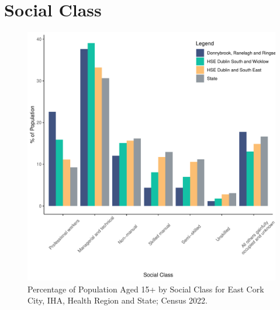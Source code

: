 \documentclass{article}
\begin{document}
\section{Social Class}\label{sect:SC}
\begin{figure}[H]
	\centering
	\includegraphics[width = 140mm]{../figures/SocialClassED.pdf}
	\caption{Percentage of Population Aged 15+ by Social Class for East Cork City, IHA, Health Region and State; Census 2022.}
	\label{fig:vbnv}
	\end{figure}
\end{document}
